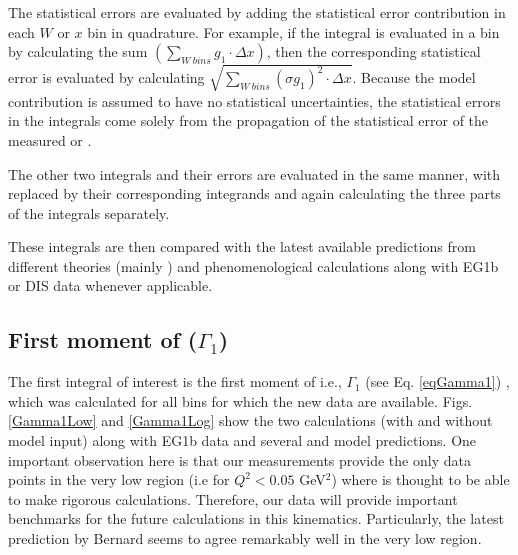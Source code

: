 The statistical errors are evaluated by adding the statistical error contribution in each $W$ or $x$ bin in quadrature. For example, if the integral is evaluated in a \qsqs bin by calculating the sum $\left( \sum\limits_{W ~bins} g_1 \cdot \Delta x \right) $, then the corresponding statistical error is evaluated by calculating %
$\sqrt{ \sum\limits_{W ~bins} (\sigma g_1)^2 \cdot \Delta x  }$. %
Because the model contribution is assumed to have no statistical uncertainties, the statistical errors in the integrals come solely from the propagation of the statistical error of the measured \gones or \afone.

The other two integrals and their errors are evaluated in the same manner, with \gones replaced by their corresponding integrands and again calculating the three parts of the integrals separately. 

 These integrals are then compared with the latest available predictions from different theories (mainly \chipt) and phenomenological calculations along with EG1b or DIS data whenever applicable.


\subsection{First moment of \gones ($\Gamma_1$)}
The first integral of interest is %
the first moment of \gones i.e., $\Gamma_1$ (see Eq. \ref{eqGamma1}) , which was calculated for all %
\qsqs bins for which the new data are %
available. Figs. \ref{Gamma1Low} and \ref{Gamma1Log} show the two calculations (with and without model input) along with EG1b data and several \chipts and model predictions. One important observation here is that our measurements provide the only data points in %
the very low \qsqs region (i.e for $Q^2<0.05$ GeV$^2$) where \chipts is thought to be able to make %
rigorous calculations. Therefore, our data will provide important benchmarks for the future calculations in this kinematics. Particularly, the latest \chipts prediction by Bernard \etal \cite{BEKM13} seems to agree remarkably well in %
the very low \qsqs region.

